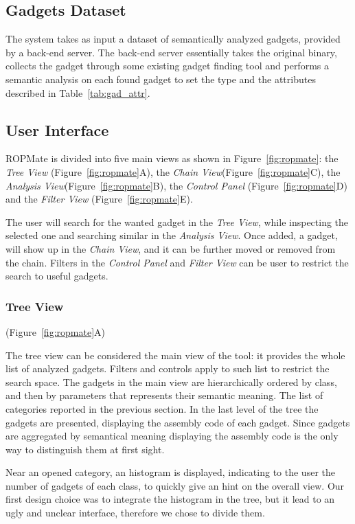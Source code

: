 \documentclass[twocolumn, 11pt]{article}
\begin{document}
\subsection{Gadgets Dataset} The system takes as input a dataset of semantically analyzed gadgets, provided by a back-end server. The back-end server essentially takes the original binary, collects the gadget through some existing gadget finding tool and performs a semantic analysis on each found gadget to set the type and the attributes described in Table~\ref{tab:gad_attr}.

\subsection{User Interface}
ROPMate is divided into five main views as shown in Figure~\ref{fig:ropmate}: the \textit{Tree View} (Figure~\ref{fig:ropmate}A), the \textit{Chain View}(Figure~\ref{fig:ropmate}C), the \textit{Analysis View}(Figure~\ref{fig:ropmate}B), the \textit{Control Panel} (Figure~\ref{fig:ropmate}D) and the \textit{Filter View} (Figure~\ref{fig:ropmate}E).

The user will search for the wanted gadget in the \textit{Tree View}, while inspecting the selected one and searching similar in the \textit{Analysis View}. Once added, a gadget, will show up in the \textit{Chain View}, and it can be further moved or removed from the chain. Filters in the \textit{Control Panel} and \textit{Filter View} can be user to restrict the search to useful gadgets.

\subsubsection{Tree View}
(Figure~\ref{fig:ropmate}A)

The tree view can be considered the main view of the tool: it provides the whole list of analyzed gadgets. Filters and controls apply to such list to restrict the search space. The gadgets in the main view are hierarchically ordered by class, and then by parameters that represents their semantic meaning. The list of categories reported in the previous section. In the last level of the tree the gadgets are presented, displaying the assembly code of each gadget. Since gadgets are aggregated by semantical meaning displaying the assembly code is the only way to distinguish them at first sight.

Near an opened category, an histogram is displayed, indicating to the user the number of gadgets of each class, to quickly give an hint on the overall view. Our first design choice was to integrate the histogram in the tree, but it lead to an ugly and unclear interface, therefore we chose to divide them.
\end{document}
